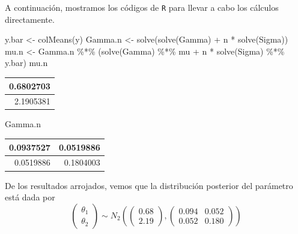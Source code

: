 \documentclass[
  10pt,
  spanish,
]{book}
\newenvironment{Shaded}{\begin{snugshade}}{\end{snugshade}}
\newcommand{\FunctionTok}[1]{\textcolor[rgb]{0.00,0.00,0.00}{#1}}
\newcommand{\NormalTok}[1]{#1}
\newcommand{\OtherTok}[1]{\textcolor[rgb]{0.56,0.35,0.01}{#1}}
\newcommand{\SpecialCharTok}[1]{\textcolor[rgb]{0.00,0.00,0.00}{#1}}
\theoremstyle{definition}
\theoremstyle{definition}
\theoremstyle{definition}
\theoremstyle{definition}
\theoremstyle{remark}
\begin{document}
A continuación, mostramos los códigos de \texttt{R} para llevar a cabo los cálculos directamente.

\begin{Shaded}
\begin{Highlighting}[]
\NormalTok{y.bar }\OtherTok{\textless{}{-}} \FunctionTok{colMeans}\NormalTok{(y)}
\NormalTok{Gamma.n }\OtherTok{\textless{}{-}} \FunctionTok{solve}\NormalTok{(}\FunctionTok{solve}\NormalTok{(Gamma) }\SpecialCharTok{+}\NormalTok{ n }\SpecialCharTok{*} \FunctionTok{solve}\NormalTok{(Sigma))}
\NormalTok{mu.n }\OtherTok{\textless{}{-}}\NormalTok{ Gamma.n }\SpecialCharTok{\%*\%} 
\NormalTok{  (}\FunctionTok{solve}\NormalTok{(Gamma) }\SpecialCharTok{\%*\%}\NormalTok{ mu }\SpecialCharTok{+}\NormalTok{ n }\SpecialCharTok{*} \FunctionTok{solve}\NormalTok{(Sigma) }\SpecialCharTok{\%*\%}\NormalTok{ y.bar)}
\NormalTok{mu.n}
\end{Highlighting}
\end{Shaded}

\begin{tabular}{r}
\hline
0.6802703\\
\hline
2.1905381\\
\hline
\end{tabular}

\begin{Shaded}
\begin{Highlighting}[]
\NormalTok{Gamma.n}
\end{Highlighting}
\end{Shaded}

\begin{tabular}{r|r}
\hline
0.0937527 & 0.0519886\\
\hline
0.0519886 & 0.1804003\\
\hline
\end{tabular}

De los resultados arrojados, vemos que la distribución posterior del parámetro está dada por
\begin{equation*}
\begin{pmatrix}
\theta_1\\
\theta_2
\end{pmatrix}
\sim N_2\left(\begin{pmatrix}
0.68\\
2.19
\end{pmatrix},\begin{pmatrix}
0.094&0.052\\
0.052&0.180
\end{pmatrix}\right)
\end{equation*}
\end{document}
